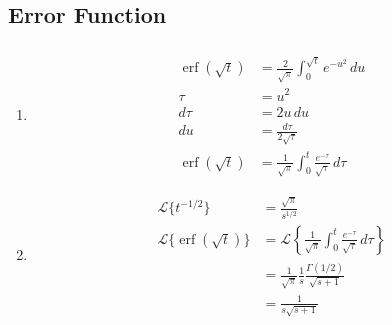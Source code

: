 \documentclass{article}
\DeclareMathOperator{\erf}{erf}
\begin{document}
\subsection{Error Function}

\subsubsection{}

\begin{enumerate}
  \item

        \begin{align*}
          \erf(\sqrt{t}) & = \frac{2}{\sqrt{\pi}} \int_0^{\sqrt{t}} e^{-u^2} \,d u                \\
          \tau           & = u^2                                                                  \\
          d \tau         & = 2 u \,d u                                                            \\
          d u            & = \frac{d \tau}{2 \sqrt{\tau}}                                         \\
          \erf(\sqrt{t}) & = \frac{1}{\sqrt{\pi}} \int_0^t \frac{e^{-\tau}}{\sqrt{\tau}} \,d \tau
        \end{align*}

  \item

        \begin{align*}
          \mathcal{L}\{t^{-1 / 2}\}     & = \frac{\sqrt{\pi}}{s^{1 / 2}}                                                                     \\
          \mathcal{L}\{\erf(\sqrt{t})\} & = \mathcal{L}\left\{ \frac{1}{\sqrt{\pi}} \int_0^t \frac{e^{-\tau}}{\sqrt{\tau}} \,d \tau \right\} \\
                                        & = \frac{1}{\sqrt{\pi}} \frac{1}{s} \frac{\Gamma(1 / 2)}{\sqrt{s + 1}}                              \\
                                        & = \frac{1}{s \sqrt{s + 1}}
        \end{align*}
\end{enumerate}

\setcounter{subsubsection}{8}
\subsubsection{}
\end{document}
